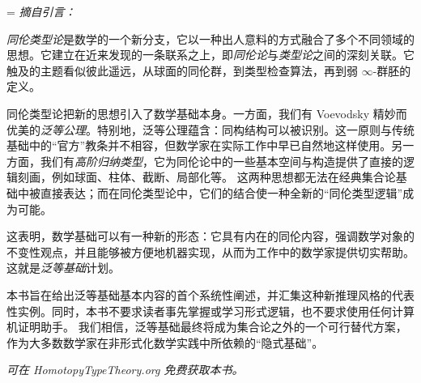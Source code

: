 
{
\parindent=0pt
\parskip=\baselineskip
{\OPTbacktitlefont
\textit{摘自引言：}}
\OPTbackfont

\emph{同伦类型论}是数学的一个新分支，它以一种出人意料的方式融合了多个不同领域的思想。它建立在近来发现的一条联系之上，即\emph{同伦论}与\emph{类型论}之间的深刻关联。它触及的主题看似彼此遥远，从球面的同伦群，到类型检查算法，再到弱 $\infty$-群胚的定义。

同伦类型论把新的思想引入了数学基础本身。一方面，我们有 Voevodsky 精妙而优美的\emph{泛等公理}。特别地，泛等公理蕴含：同构结构可以被识别。这一原则与传统基础中的“官方”教条并不相容，但数学家在实际工作中早已自然地这样使用。另一方面，我们有\emph{高阶归纳类型}，它为同伦论中的一些基本空间与构造提供了直接的逻辑刻画，例如球面、柱体、截断、局部化等。
这两种思想都无法在经典集合论基础中被直接表达；而在同伦类型论中，它们的结合使一种全新的“同伦类型逻辑”成为可能。

这表明，数学基础可以有一种新的形态：它具有内在的同伦内容，强调数学对象的不变性观点，并且能够被方便地机器实现，从而为工作中的数学家提供切实帮助。这就是\emph{泛等基础}计划。

本书旨在给出泛等基础基本内容的首个系统性阐述，并汇集这种新推理风格的代表性实例。同时，本书不要求读者事先掌握或学习形式逻辑，也不要求使用任何计算机证明助手。
我们相信，泛等基础最终将成为集合论之外的一个可行替代方案，作为大多数数学家在非形式化数学实践中所依赖的“隐式基础”。

\bigskip

\begin{center}
  {\Large
  \textit{可在 HomotopyTypeTheory.org 免费获取本书。}}
\end{center}
}
